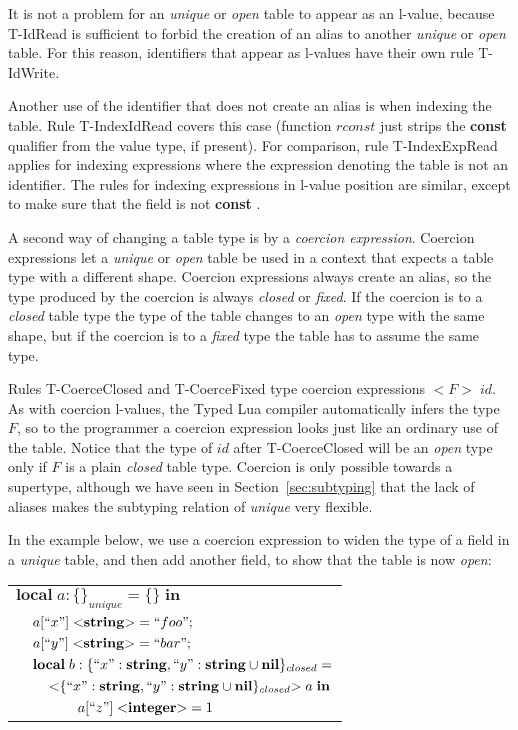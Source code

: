 \documentclass[10pt]{sigplanconf}
\newcommand{\Nil}{\mathbf{nil}}
\newcommand{\Integer}{\mathbf{integer}}
\newcommand{\String}{\mathbf{string}}
\begin{document}
It is not a problem for an {\em unique} or {\em open}
table to appear as an l-value, because {\sc T-IdRead} is
sufficient to forbid the creation of an alias to another
{\em unique} or {\em open} table. For this reason,
identifiers that appear as l-values have their own rule
{\sc T-IdWrite}.

Another use of the identifier that does not create an
alias is when indexing the table. Rule {\sc T-IndexIdRead}
covers this case (function $rconst$ just strips the {\bf const} qualifier from the value type, if present). For comparison, rule {\sc T-IndexExpRead}
applies for indexing expressions where the expression
denoting the table is not an identifier. The rules for
indexing expressions in l-value position are similar,
except to make sure that the field is not {\bf const} .

A second way of changing a table type is by a 
{\em coercion expression}. Coercion expressions let
a {\em unique} or {\em open} table be used in a context
that expects a table type with a different shape.
Coercion expressions always create an alias, so
the type produced by the coercion is always
{\em closed} or {\em fixed}. If the coercion is to a
{\em closed} table type the type of the table changes
to an {\em open} type with the same shape, but if
the coercion is to a {\em fixed} type the table has
to assume the same type.

Rules {\sc T-CoerceClosed} and {\sc T-CoerceFixed} type
coercion expressions ${<}F{>} \; id$.
As with coercion l-values, the Typed Lua compiler automatically
infers the type $F$, so to the programmer a coercion
expression looks just like an ordinary use of the table.
Notice that the type of $id$ after {\sc T-CoerceClosed} will be an {\em open} type
only if $F$ is a plain {\em closed} table type.
Coercion is only possible towards a supertype, although
we have seen in Section~\ref{sec:subtyping} that the lack
of aliases makes the subtyping relation of {\em unique}
very flexible.

In the example below, we use a coercion expression to
widen the type of a field in a {\em unique}
table, and then add another field, to show that the
table is now {\em open}:
{\small
\begin{center}
\begin{tabular}{llll}
\multicolumn{4}{l}{$\mathbf{local} \; a:\{\}_{unique} = \{ \} \; \mathbf{in}$}\\
& \multicolumn{3}{l}{$a[``x"] \; {<}\String{>} = ``foo";$}\\
& \multicolumn{3}{l}{$a[``y"] \; {<}\String{>} = ``bar";$}\\
& \multicolumn{3}{l}{$\mathbf{local} \; b:\{``x":\String, ``y":\String \cup \Nil \}_{closed} =$}\\
& & \multicolumn{2}{l}{${<}\{``x":\String, ``y":\String \cup \Nil\}_{closed}{>} \; a \; \mathbf{in}$}\\
& & & \multicolumn{1}{l}{$a[``z"] \; {<}\Integer{>} = 1$}
\end{tabular}
\end{center}
}
\end{document}
